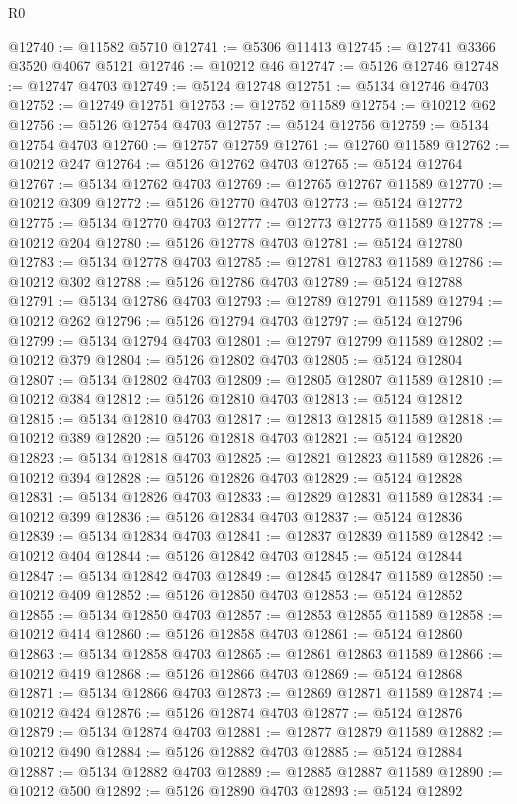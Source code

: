 \begin{lexlean}{R0}
\begin{coremodule}
@12740 := @11582 @5710
@12741 := @5306 @11413
@12745 := @12741 @3366 @3520 @4067 @5121
@12746 := @10212 @46
@12747 := @5126 @12746
@12748 := @12747 @4703
@12749 := @5124 @12748
@12751 := @5134 @12746 @4703
@12752 := @12749 @12751
@12753 := @12752 @11589
@12754 := @10212 @62
@12756 := @5126 @12754 @4703
@12757 := @5124 @12756
@12759 := @5134 @12754 @4703
@12760 := @12757 @12759
@12761 := @12760 @11589
@12762 := @10212 @247
@12764 := @5126 @12762 @4703
@12765 := @5124 @12764
@12767 := @5134 @12762 @4703
@12769 := @12765 @12767 @11589
@12770 := @10212 @309
@12772 := @5126 @12770 @4703
@12773 := @5124 @12772
@12775 := @5134 @12770 @4703
@12777 := @12773 @12775 @11589
@12778 := @10212 @204
@12780 := @5126 @12778 @4703
@12781 := @5124 @12780
@12783 := @5134 @12778 @4703
@12785 := @12781 @12783 @11589
@12786 := @10212 @302
@12788 := @5126 @12786 @4703
@12789 := @5124 @12788
@12791 := @5134 @12786 @4703
@12793 := @12789 @12791 @11589
@12794 := @10212 @262
@12796 := @5126 @12794 @4703
@12797 := @5124 @12796
@12799 := @5134 @12794 @4703
@12801 := @12797 @12799 @11589
@12802 := @10212 @379
@12804 := @5126 @12802 @4703
@12805 := @5124 @12804
@12807 := @5134 @12802 @4703
@12809 := @12805 @12807 @11589
@12810 := @10212 @384
@12812 := @5126 @12810 @4703
@12813 := @5124 @12812
@12815 := @5134 @12810 @4703
@12817 := @12813 @12815 @11589
@12818 := @10212 @389
@12820 := @5126 @12818 @4703
@12821 := @5124 @12820
@12823 := @5134 @12818 @4703
@12825 := @12821 @12823 @11589
@12826 := @10212 @394
@12828 := @5126 @12826 @4703
@12829 := @5124 @12828
@12831 := @5134 @12826 @4703
@12833 := @12829 @12831 @11589
@12834 := @10212 @399
@12836 := @5126 @12834 @4703
@12837 := @5124 @12836
@12839 := @5134 @12834 @4703
@12841 := @12837 @12839 @11589
@12842 := @10212 @404
@12844 := @5126 @12842 @4703
@12845 := @5124 @12844
@12847 := @5134 @12842 @4703
@12849 := @12845 @12847 @11589
@12850 := @10212 @409
@12852 := @5126 @12850 @4703
@12853 := @5124 @12852
@12855 := @5134 @12850 @4703
@12857 := @12853 @12855 @11589
@12858 := @10212 @414
@12860 := @5126 @12858 @4703
@12861 := @5124 @12860
@12863 := @5134 @12858 @4703
@12865 := @12861 @12863 @11589
@12866 := @10212 @419
@12868 := @5126 @12866 @4703
@12869 := @5124 @12868
@12871 := @5134 @12866 @4703
@12873 := @12869 @12871 @11589
@12874 := @10212 @424
@12876 := @5126 @12874 @4703
@12877 := @5124 @12876
@12879 := @5134 @12874 @4703
@12881 := @12877 @12879 @11589
@12882 := @10212 @490
@12884 := @5126 @12882 @4703
@12885 := @5124 @12884
@12887 := @5134 @12882 @4703
@12889 := @12885 @12887 @11589
@12890 := @10212 @500
@12892 := @5126 @12890 @4703
@12893 := @5124 @12892

\end{coremodule}
\end{lexlean}
